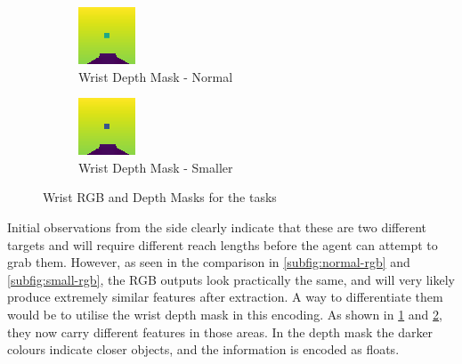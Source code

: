 \begin{figure}[htpb]
  \begin{subfigure}{0.40\linewidth}
    \centering
    \includegraphics[width=0.7\linewidth]{assets/depth-interfacing/normal-depth.png}
    \caption{Wrist Depth Mask - Normal}\label{subfig:normal-depth}
  \end{subfigure}
  \begin{subfigure}{0.40\linewidth}
    \centering
    \includegraphics[width=0.7\linewidth]{assets/depth-interfacing/smaller-depth.png}
    \caption{Wrist Depth Mask - Smaller}\label{subfig:small-depth}
  \end{subfigure}
  \caption{Wrist RGB and Depth Masks for the tasks}\label{fig:di-rgb-vs-depth}
\end{figure}

Initial observations from the side clearly indicate that these are two different targets and will require different reach lengths before the agent can attempt to grab them. However, as seen in the comparison in \ref{subfig:normal-rgb} and \ref{subfig:small-rgb}, the RGB outputs look practically the same, and will very likely produce extremely similar features after extraction. A way to differentiate them would be to utilise the wrist depth mask in this encoding. As shown in \ref{subfig:normal-depth} and \ref{subfig:small-depth}, they now carry different features in those areas. In the depth mask the darker colours indicate closer objects, and the information is encoded as floats. 

